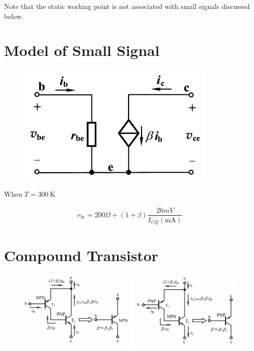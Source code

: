 Note that the static working point is not associated with small signals discussed below.

\section{Model of Small Signal}

\begin{figure}[H]
  \centering
  \includegraphics[width=0.4\linewidth]{figures/BJT-small-signal}
  \label{fig:}
\end{figure}

When $T = 300 \  \mathrm{K}$

\begin{equation*}
  \begin{aligned}
    r_{be} = 200 \si{\Omega} + \left( 1 + \beta \right) \dfrac{26 \si{mV}}{I_{CQ} \left( \mathrm{mA} \right)} 
  \end{aligned}
\end{equation*}

\section{Compound Transistor}

\begin{figure}[H]
  \centering
  \includegraphics[width=0.7\linewidth]{figures/BJT-compound}
  \label{fig:}
\end{figure}



